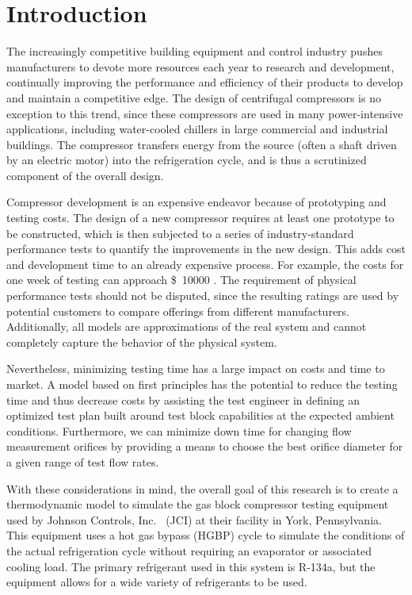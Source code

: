 \chapter{Introduction} \label{cha:intro}
The increasingly competitive building equipment and control industry 
pushes manufacturers to devote more resources each year to research and 
development, continually improving the performance and efficiency 
of their products to develop and maintain a competitive edge. 
The design of centrifugal compressors is no exception to this trend, 
since these compressors are used in many power-intensive applications,
including water-cooled chillers in large commercial and industrial buildings. 
The compressor transfers energy from the source (often a shaft driven by an 
electric motor) into the refrigeration cycle, and is thus 
a scrutinized component of the overall design.

Compressor development is an expensive endeavor 
because of prototyping and testing costs. 
The design of a new compressor requires at least one 
prototype to be constructed, which is then subjected to 
a series of industry-standard performance tests 
to quantify the improvements in the new design.
This adds cost and development time to an already expensive process. 
For example, the costs for one week of testing can approach 
\SI{10000}[\$]{} \citep{sommer2013}.
The requirement of physical performance tests should not be disputed, 
since the resulting ratings are used by potential customers 
to compare offerings from different manufacturers. 
Additionally, all models are approximations of the real system and 
cannot completely capture the behavior of the physical system.

Nevertheless, minimizing testing time has a 
large impact on costs and time to market. 
A model based on first principles has the potential to 
reduce the testing time and thus decrease costs by 
assisting the test engineer in defining an optimized test plan 
built around test block capabilities at the expected ambient conditions.
Furthermore, we can minimize down time for changing 
flow measurement orifices by providing a means 
to choose the best orifice diameter for a given range of test flow rates.

With these considerations in mind, the overall goal of this research is to 
create a thermodynamic model to simulate the  gas block 
compressor testing equipment used by Johnson Controls, Inc.~%
(JCI) 
at their facility in York, Pennsylvania. 
This equipment uses a hot gas bypass
(HGBP) cycle to simulate the conditions of the actual refrigeration cycle
without requiring an evaporator or associated cooling load.
The primary refrigerant used in this system is R-134a, but the equipment
allows for a wide variety of refrigerants to be used.


